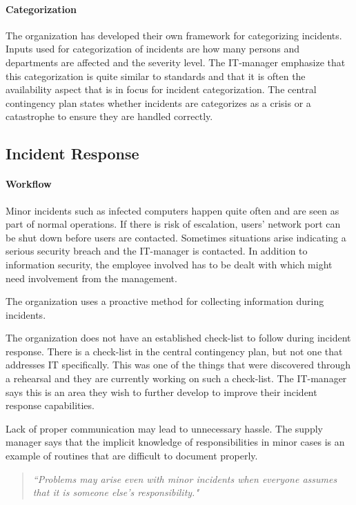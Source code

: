\paragraph{Categorization}
The organization has developed their own framework for categorizing incidents. Inputs used for categorization of incidents are how many persons and departments are affected and the severity level. The IT-manager emphasize that this categorization is quite similar to standards and that it is often the availability aspect that is in focus for incident categorization. The central contingency plan states whether incidents are categorizes as a crisis or a catastrophe to ensure they are handled correctly.

\subsection{Incident Response}
\paragraph{Workflow}
Minor incidents such as infected computers happen quite often and are seen as part of normal operations. If there is risk of escalation, users' network port can be shut down before users are contacted. Sometimes situations arise indicating a serious security breach and the IT-manager is contacted. In addition to information security, the employee involved has to be dealt with which might need involvement from the management.



The organization uses a proactive method for collecting information during incidents. %

The organization does not have an established check-list to follow during incident response. There is a check-list in the central contingency plan, but not one that addresses IT specifically. This was one of the things that were discovered through a rehearsal and they are currently working on such a check-list. The IT-manager says this is an area they wish to further develop to improve their incident response capabilities. 

Lack of proper communication may lead to unnecessary hassle. The supply manager says that the implicit knowledge of responsibilities in minor cases is an example of routines that are difficult to document properly.
\begin{quote}
\textit{``Problems may arise even with minor incidents when everyone assumes that it is someone else's responsibility."}
\end{quote}

